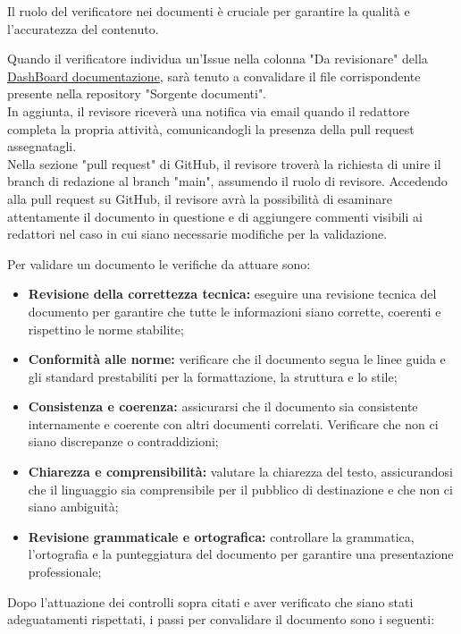 Il ruolo del verificatore nei documenti è cruciale per garantire la qualità e l'accuratezza del contenuto. 

Quando il verificatore individua un'Issue nella colonna "Da revisionare" della \href{https://github.com/orgs/ByteOps-swe/projects/1/views/1}{DashBoard documentazione}, sarà tenuto a convalidare il file corrispondente presente nella repository "Sorgente documenti". \\
In aggiunta, il revisore riceverà una notifica via email quando il redattore completa la propria attività, comunicandogli la presenza della pull request assegnatagli. \\
Nella sezione "pull request" di GitHub, il revisore troverà la richiesta di unire il branch di redazione al branch "main", assumendo il ruolo di revisore. Accedendo alla pull request su GitHub, il revisore avrà la possibilità di esaminare attentamente il documento in questione e di aggiungere commenti visibili ai redattori nel caso in cui siano necessarie modifiche per la validazione. 

\vspace{0.3cm}

Per validare un documento le verifiche da attuare sono:
\begin{itemize}
    \item \textbf{Revisione della correttezza tecnica:} 
        eseguire una revisione tecnica del documento per garantire che tutte le informazioni siano corrette, coerenti e rispettino le norme stabilite; 
    \item \textbf{Conformità alle norme:} 
        verificare che il documento segua le linee guida e gli standard prestabiliti per la formattazione, la struttura e lo stile; 
    \item \textbf{Consistenza e coerenza:} 
        assicurarsi che il documento sia consistente internamente e coerente con altri documenti correlati. Verificare che non ci siano discrepanze o contraddizioni;
    \item \textbf{Chiarezza e comprensibilità:} 
        valutare la chiarezza del testo, assicurandosi che il linguaggio sia comprensibile per il pubblico di destinazione e che non ci siano ambiguità;
    \item \textbf{Revisione grammaticale e ortografica:} 
        controllare la grammatica, l'ortografia e la punteggiatura del documento per garantire una presentazione professionale;
\end{itemize}

Dopo l'attuazione dei controlli sopra citati e aver verificato che siano stati adeguatamenti rispettati, i passi per convalidare il documento sono i seguenti: 

